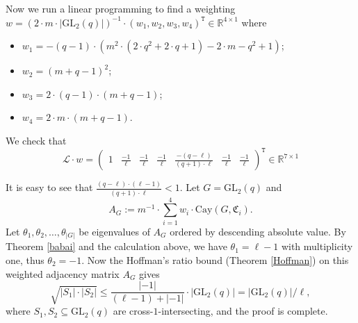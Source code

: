 \documentclass[12pt, reqno]{amsart}
\theoremstyle{definition}
\theoremstyle{remark}
\numberwithin{equation}{section}
\newcommand{\BR}{\mathbb{R}}
\newcommand{\ls}{\leqslant}
\newcommand{\pt}[1]{\left(#1\right)}
\newcommand{\abs}[1]{\left|#1\right|}
\newcommand{\fC}{\mathfrak{C}}
\newcommand{\GL}{\mathrm{GL}}
\newcommand{\Cay}{\mathrm{Cay}}
\begin{document}
Now we run a linear programming to find a weighting $w = \pt{2\cdot m \cdot \abs{\GL_2(q)}}^{-1}\cdot\pt{w_1, w_2, w_3, w_4}^\mathtt{T} \in \BR^{4 \times 1}$ where
\begin{itemize}
	\item $w_1 = -(q-1)\cdot \left(m^2 \cdot \left(2 \cdot q^2+2 \cdot q+1\right)-2 \cdot m-q^2+1\right)$;
	
	\item $w_2 = (m+q-1)^2$;
	
	\item $w_3 = 2\cdot(q-1)\cdot (m+q-1)$;
	
	\item $w_4 = 2\cdot m\cdot(m+q-1)$.
\end{itemize}
We check that
\[\mathcal{L}\cdot w = \begin{pmatrix}
	1 & \frac{-1}{\ell} & \frac{-1}{\ell} & \frac{-1}{\ell} & \frac{-(q - \ell)}{(q + 1)\cdot\ell} & \frac{-1}{\ell} & \frac{-1}{\ell}
\end{pmatrix}^{\mathtt{T}} \in \BR^{7\times1}\]

It is easy to see that $\frac{(q - \ell)\cdot(\ell - 1)}{(q + 1)\cdot\ell} < 1$. Let $G = \GL_2(q)$ and $$A_G := m^{-1}\cdot\sum\limits_{i = 1}^{4}w_i\cdot\Cay(G, \fC_i).$$ Let $\theta_1, \theta_2, \ldots, \theta_{\abs{G}}$ be eigenvalues of $A_G$ ordered by descending absolute value. By Theorem \ref{babai} and the calculation above, we have $\theta_1 = \ell - 1$ with multiplicity one, thus $\theta_2 = -1$. Now the Hoffman's ratio bound (Theorem \ref{Hoffman}) on this weighted adjacency matrix $A_G$ gives
\[\sqrt{\abs{S_1}\cdot\abs{S_2}} \ls \frac{\abs{-1}}{(\ell - 1) + \abs{-1}}\cdot\abs{\GL_2(q)} = \abs{\GL_2(q)}/\ell,\]
where $S_1, S_2 \subseteq \GL_2(q)$ are cross-$1$-intersecting, and the proof is complete.

\newpage

\nocite{*}

	
\end{document}
